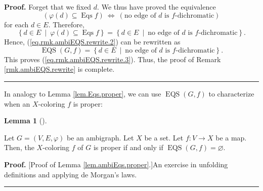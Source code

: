 \documentclass[numbers=enddot,12pt,final,onecolumn,notitlepage]{scrartcl}%
\theoremstyle{definition}
\newtheorem{lem}[theo]{Lemma}
\newenvironment{lemma}[1][]
{\begin{lem}[#1]\begin{leftbar}}
{\end{leftbar}\end{lem}}
\newenvironment{proof}[1][Proof]{\noindent\textbf{#1.} }{\ \rule{0.5em}{0.5em}}
\newenvironment{verlong}{}{}
\newenvironment{vershort}{}{}
\begin{document}
\begin{verlong}
\begin{proof}
Forget that we fixed $d$. We thus have proved the equivalence%
\[
\left(  \varphi\left(  d\right)  \subseteq\operatorname*{Eqs}f\right)
\ \Longleftrightarrow\ \left(  \text{no edge of }d\text{ is }%
f\text{-dichromatic}\right)
\]
for each $d\in E$. Therefore,%
\[
\left\{  d\in E\ \mid\ \varphi\left(  d\right)  \subseteq\operatorname*{Eqs}%
f\right\}  =\left\{  d\in E\ \mid\ \text{no edge of }d\text{ is }%
f\text{-dichromatic}\right\}  .
\]
Hence, (\ref{eq.rmk.ambiEQS.rewrite.2}) can be rewritten as%
\[
\operatorname*{EQS}\left(  G,f\right)  =\left\{  d\in E\ \mid\ \text{no edge
of }d\text{ is }f\text{-dichromatic}\right\}  .
\]
This proves (\ref{eq.rmk.ambiEQS.rewrite.3}). Thus, the proof of Remark
\ref{rmk.ambiEQS.rewrite} is complete.
\end{proof}
\end{verlong}

In analogy to Lemma \ref{lem.Eqs.proper}, we can use $\operatorname*{EQS}%
\left(  G,f\right)  $ to characterize when an $X$-coloring $f$ is proper:

\begin{lemma}
\label{lem.ambiEqs.proper}Let $G=\left(  V,E,\varphi\right)  $ be an
ambigraph. Let $X$ be a set. Let $f:V\rightarrow X$ be a map. Then, the
$X$-coloring $f$ of $G$ is proper if and only if $\operatorname*{EQS}\left(
G,f\right)  =\varnothing$.
\end{lemma}

\begin{vershort}
\begin{proof}
[Proof of Lemma \ref{lem.ambiEqs.proper}.]An exercise in unfolding definitions
and applying de Morgan's laws.
\end{proof}
\end{vershort}
\end{document}

